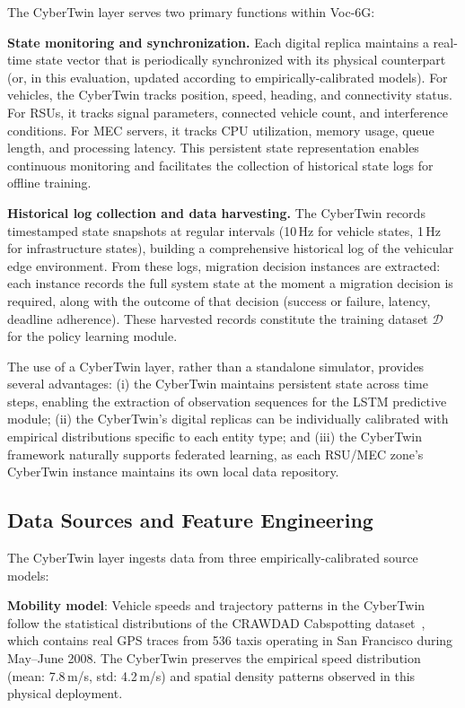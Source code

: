\documentclass[journal,twoside]{IEEEtran}
\newcommand{\VocSixG}{Voc-6G}
\begin{document}
The CyberTwin layer serves two primary functions within \VocSixG{}:

\textbf{State monitoring and synchronization.} Each digital replica maintains a real-time state vector that is periodically synchronized with its physical counterpart (or, in this evaluation, updated according to empirically-calibrated models). For vehicles, the CyberTwin tracks position, speed, heading, and connectivity status. For RSUs, it tracks signal parameters, connected vehicle count, and interference conditions. For MEC servers, it tracks CPU utilization, memory usage, queue length, and processing latency. This persistent state representation enables continuous monitoring and facilitates the collection of historical state logs for offline training.

\textbf{Historical log collection and data harvesting.} The CyberTwin records timestamped state snapshots at regular intervals (10\,Hz for vehicle states, 1\,Hz for infrastructure states), building a comprehensive historical log of the vehicular edge environment. From these logs, migration decision instances are extracted: each instance records the full system state at the moment a migration decision is required, along with the outcome of that decision (success or failure, latency, deadline adherence). These harvested records constitute the training dataset $\mathcal{D}$ for the policy learning module.

The use of a CyberTwin layer, rather than a standalone simulator, provides several advantages: (i) the CyberTwin maintains persistent state across time steps, enabling the extraction of observation sequences for the LSTM predictive module; (ii) the CyberTwin's digital replicas can be individually calibrated with empirical distributions specific to each entity type; and (iii) the CyberTwin framework naturally supports federated learning, as each RSU/MEC zone's CyberTwin instance maintains its own local data repository.

\subsection{Data Sources and Feature Engineering}
\label{sec:data_sources}

The CyberTwin layer ingests data from three empirically-calibrated source models:

\textbf{Mobility model}: Vehicle speeds and trajectory patterns in the CyberTwin follow the statistical distributions of the CRAWDAD Cabspotting dataset~\cite{crawdad2009}, which contains real GPS traces from 536 taxis operating in San Francisco during May--June 2008. The CyberTwin preserves the empirical speed distribution (mean: 7.8\,m/s, std: 4.2\,m/s) and spatial density patterns observed in this physical deployment.
\end{document}
